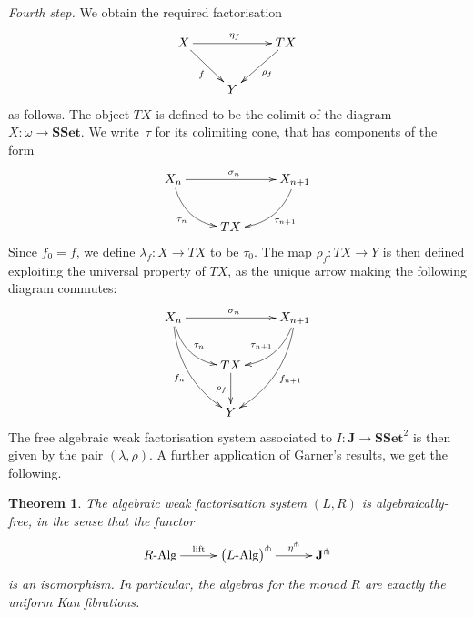 \documentclass[reqno,10pt,a4paper,oneside]{amsart}
\newcommand{\RAlg}{R\text{-}\mathrm{Alg}}
\newcommand{\LAlg}{L\text{-}\mathrm{Alg}}
\newtheorem{theorem}{Theorem}[section]
\theoremstyle{definition}
\newcommand{\co}{\colon}
\newcommand{\SSet}{\mathbf{SSet}}
\begin{document}
 \noindent
 \emph{Fourth step.}  We obtain the required factorisation
\[
\xymatrix{
X \ar[dr]_{f} \ar[rr]^{\eta_f} & & TX \ar[dl]^{\rho_f} \\
 & Y & }
 \]
as follows. The object $TX$ is defined to be the colimit of the diagram $X \co \omega \to \SSet$. We write~$\tau$
for its colimiting cone, that has components of the form
 \[
 \xymatrix{
  X_n   \ar@/_1pc/[dr]_-{\tau_n}  \ar[rr]^{\sigma_n} &   & X_{n+1} \ar@/^1pc/[dl]^-{\tau_{n+1}}   \\
   &  TX &  }
  \]
Since $f_0 = f$, we define $\lambda_f \co X \to TX$  to be $\tau_0$. The map $\rho_f \co TX \to Y$ is then defined
exploiting the universal property of $TX$, as the unique arrow making the following diagram commutes:
\[
 \xymatrix{
  X_n   \ar@/_1pc/[dr]^-{\tau_n}  \ar[rr]^{\sigma_n} \ar@/_1pc/[ddr]_{f_n} &   & X_{n+1} \ar@/^1pc/[dl]_-{\tau_{n+1}}  \ar@/^1pc/[ddl]^{f_{n+1}}  \\
   &  TX \ar[d]_{\rho_f}  &  \\
    & Y & }
  \]
The free algebraic weak factorisation system associated to $I \co \mathbf{J} \to \SSet^2$ is then
 given by the pair $(\lambda, \rho)$. A further application of Garner's results, we get the following.
 
 \begin{theorem} The algebraic weak factorisation system $(L, R)$ is algebraically-free, in 
 the sense that the functor
 \[
 \xymatrix@C=1cm{
  \RAlg \ar[r]^-{\textup{lift}} &
    \big( \LAlg \big)^\pitchfork \ar[r]^-{\eta^\pitchfork} &
   \mathbf{J}^\pitchfork}
  \]
  is an isomorphism. In particular, the algebras for the monad $R$ are exactly the
  uniform Kan fibrations.
  \end{theorem} 
 
 
\end{document}
